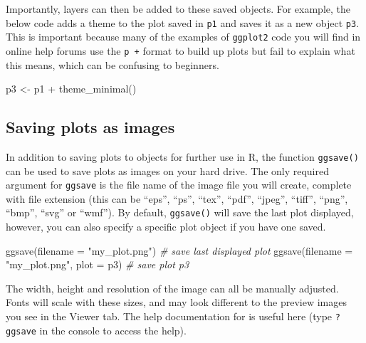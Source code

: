 \documentclass[
  english,
  doc,floatsintext]{apa6}
\newenvironment{Shaded}{\begin{snugshade}}{\end{snugshade}}
\newcommand{\AttributeTok}[1]{\textcolor[rgb]{0.77,0.63,0.00}{#1}}
\newcommand{\CommentTok}[1]{\textcolor[rgb]{0.56,0.35,0.01}{\textit{#1}}}
\newcommand{\FunctionTok}[1]{\textcolor[rgb]{0.00,0.00,0.00}{#1}}
\newcommand{\NormalTok}[1]{#1}
\newcommand{\OtherTok}[1]{\textcolor[rgb]{0.56,0.35,0.01}{#1}}
\newcommand{\SpecialCharTok}[1]{\textcolor[rgb]{0.00,0.00,0.00}{#1}}
\newcommand{\StringTok}[1]{\textcolor[rgb]{0.31,0.60,0.02}{#1}}
\begin{document}
Importantly, layers can then be added to these saved objects. For example, the below code adds a theme to the plot saved in \texttt{p1} and saves it as a new object \texttt{p3}. This is important because many of the examples of \texttt{ggplot2} code you will find in online help forums use the \texttt{p\ +} format to build up plots but fail to explain what this means, which can be confusing to beginners.

\begin{Shaded}
\begin{Highlighting}[]
\NormalTok{p3 }\OtherTok{\textless{}{-}}\NormalTok{ p1 }\SpecialCharTok{+} \FunctionTok{theme\_minimal}\NormalTok{()}
\end{Highlighting}
\end{Shaded}

\hypertarget{saving-plots-as-images}{%
\subsection{Saving plots as images}\label{saving-plots-as-images}}

In addition to saving plots to objects for further use in R, the function \texttt{ggsave()} can be used to save plots as images on your hard drive. The only required argument for \texttt{ggsave} is the file name of the image file you will create, complete with file extension (this can be ``eps'', ``ps'', ``tex'', ``pdf'', ``jpeg'', ``tiff'', ``png'', ``bmp'', ``svg'' or ``wmf''). By default, \texttt{ggsave()} will save the last plot displayed, however, you can also specify a specific plot object if you have one saved.

\begin{Shaded}
\begin{Highlighting}[]
\FunctionTok{ggsave}\NormalTok{(}\AttributeTok{filename =} \StringTok{"my\_plot.png"}\NormalTok{) }\CommentTok{\# save last displayed plot}
\FunctionTok{ggsave}\NormalTok{(}\AttributeTok{filename =} \StringTok{"my\_plot.png"}\NormalTok{, }\AttributeTok{plot =}\NormalTok{ p3) }\CommentTok{\# save plot p3}
\end{Highlighting}
\end{Shaded}

The width, height and resolution of the image can all be manually adjusted. Fonts will scale with these sizes, and may look different to the preview images you see in the Viewer tab. The help documentation for is useful here (type \texttt{?ggsave} in the console to access the help).
\end{document}
